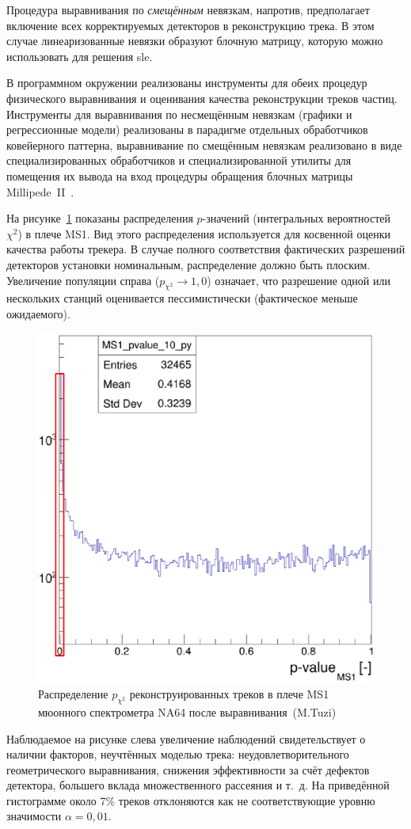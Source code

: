 Процедура выравнивания по \emph{смещённым} невязкам, напротив,
предполагает включение всех корректируемых детекторов в реконструкцию трека.
В этом случае линеаризованные невязки образуют блочную матрицу,
которую можно использовать для решения \acrshort{sle}.

В программном окружении реализованы инструменты
для обеих процедур физического выравнивания и оценивания качества
реконструкции треков частиц. Инструменты для выравнивания по
несмещённым невязкам (графики и регрессионные модели) реализованы
в парадигме отдельных обработчиков ковейерного паттерна, выравнивание
по смещённым невязкам реализовано в виде специализированных
обработчиков и специализированной утилиты для помещения их вывода
на вход процедуры обращения блочных матрицы
Millipede~II~\cite{millipede-blobel2009}.

На рисунке~\ref{fig:na64-muon-p-value-distribution} показаны распределения $p$-значений
(интегральных вероятностей $\chi^2$) в плече MS1. Вид этого распределения
используется для косвенной оценки качества работы трекера. В случае полного
соответствия фактических разрешений детекторов установки номинальным,
распределение должно быть плоским. Увеличение популяции справа
($p_{\chi^2} \rightarrow 1{,}0$) означает, что разрешение одной или нескольких
станций оценивается пессимистически (фактическое меньше ожидаемого).
\begin{figure}[ht]
    \centering
    \includegraphics[width=0.5\linewidth]{images/na64-ms1-p-value-before.png}
    \caption{Распределение $p_{\chi^2}$ реконструированных треков в плече MS1 мюонного спектрометра NA64 после выравнивания~(M.Tuzi)}
    \label{fig:na64-muon-p-value-distribution}
\end{figure}

Наблюдаемое на рисунке слева увеличение наблюдений свидетельствует
о наличии факторов, неучтённых моделью трека: неудовлетворительного
геометрического выравнивания, снижения эффективности за счёт
дефектов детектора, большего вклада множественного
рассеяния и т.~д.
На приведённой гистограмме около 7\% треков отклоняются как не
соответствующие уровню значимости $\alpha = 0{,}01$.
